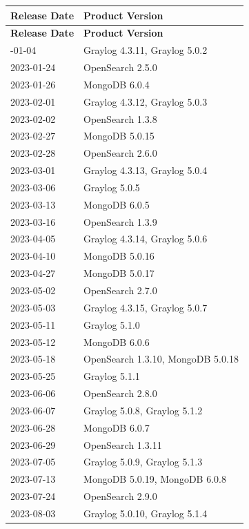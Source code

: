 \documentclass[../main.tex]{subfiles}
\begin{document}
\begin{longtable}{|l|l|}
\hline
\textbf{Release Date} & \textbf{Product Version} \\ \hline
\endfirsthead
\hline
\textbf{Release Date} & \textbf{Product Version} \\ \hline
\endhead
\hline
\endfoot
\hline
\endlastfoot
2023-01-04 & Graylog 4.3.11, Graylog 5.0.2 \\ \hline
2023-01-24 & OpenSearch 2.5.0 \\ \hline
2023-01-26 & MongoDB 6.0.4 \\ \hline
2023-02-01 & Graylog 4.3.12, Graylog 5.0.3 \\ \hline
2023-02-02 & OpenSearch 1.3.8 \\ \hline
2023-02-27 & MongoDB 5.0.15 \\ \hline
2023-02-28 & OpenSearch 2.6.0 \\ \hline
2023-03-01 & Graylog 4.3.13, Graylog 5.0.4 \\ \hline
2023-03-06 & Graylog 5.0.5 \\ \hline
2023-03-13 & MongoDB 6.0.5 \\ \hline
2023-03-16 & OpenSearch 1.3.9 \\ \hline
2023-04-05 & Graylog 4.3.14, Graylog 5.0.6 \\ \hline
2023-04-10 & MongoDB 5.0.16 \\ \hline
2023-04-27 & MongoDB 5.0.17 \\ \hline
2023-05-02 & OpenSearch 2.7.0 \\ \hline
2023-05-03 & Graylog 4.3.15, Graylog 5.0.7 \\ \hline
2023-05-11 & Graylog 5.1.0 \\ \hline
2023-05-12 & MongoDB 6.0.6 \\ \hline
2023-05-18 & OpenSearch 1.3.10, MongoDB 5.0.18 \\ \hline
2023-05-25 & Graylog 5.1.1 \\ \hline
2023-06-06 & OpenSearch 2.8.0 \\ \hline
2023-06-07 & Graylog 5.0.8, Graylog 5.1.2 \\ \hline
2023-06-28 & MongoDB 6.0.7 \\ \hline
2023-06-29 & OpenSearch 1.3.11 \\ \hline
2023-07-05 & Graylog 5.0.9, Graylog 5.1.3 \\ \hline
2023-07-13 & MongoDB 5.0.19, MongoDB 6.0.8 \\ \hline
2023-07-24 & OpenSearch 2.9.0 \\ \hline
2023-08-03 & Graylog 5.0.10, Graylog 5.1.4 \\ \hline

\end{longtable}
\end{document}
